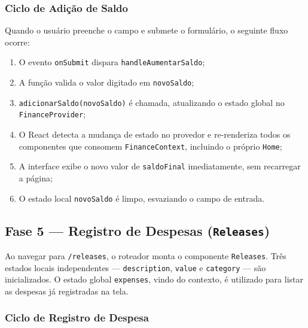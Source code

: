 \documentclass{article}
\begin{document}
\subsubsection*{Ciclo de Adição de Saldo}

Quando o usuário preenche o campo e submete o formulário, o seguinte fluxo ocorre:

\begin{enumerate}
  \item O evento \texttt{onSubmit} dispara \texttt{handleAumentarSaldo};
  \item A função valida o valor digitado em \texttt{novoSaldo};
  \item \texttt{adicionarSaldo(novoSaldo)} é chamada, atualizando o estado global no \texttt{FinanceProvider};
  \item O React detecta a mudança de estado no provedor e re-renderiza todos os componentes que consomem \texttt{FinanceContext}, incluindo o próprio \texttt{Home};
  \item A interface exibe o novo valor de \texttt{saldoFinal} imediatamente, sem recarregar a página;
  \item O estado local \texttt{novoSaldo} é limpo, esvaziando o campo de entrada.
\end{enumerate}

\subsection{Fase 5 — Registro de Despesas (\texttt{Releases})}

Ao navegar para \texttt{/releases}, o roteador monta o componente \texttt{Releases}. Três estados locais independentes — \texttt{description}, \texttt{value} e \texttt{category} — são inicializados. O estado global \texttt{expenses}, vindo do contexto, é utilizado para listar as despesas já registradas na tela.

\subsubsection*{Ciclo de Registro de Despesa}
\end{document}
